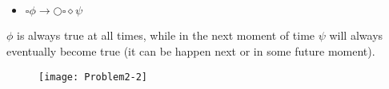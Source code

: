 \subsection{}

\begin{itemize}
   \item[] $\square \phi \rightarrow \bigcirc \square \diamond \psi$ 
\end{itemize}

\indent $\phi$ is always true at all times, while in the next moment of time $\psi$ will always eventually become true (it can be happen next or in some future moment).

\begin{figure}[h!]
	\centering \texttt{[image: Problem2-2]}
\end{figure}